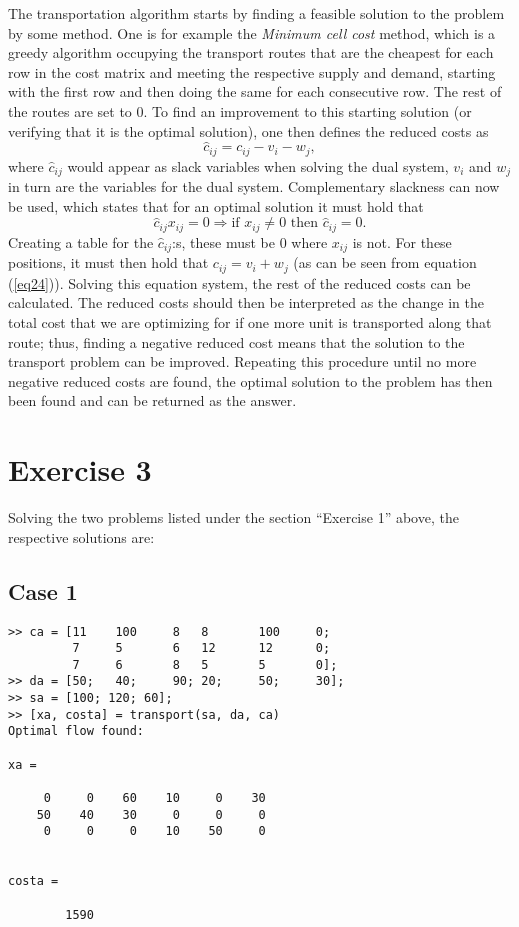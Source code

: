 \documentclass{article}
\begin{document}
  \noindent
  The transportation algorithm starts by finding a feasible solution to the
  problem by some method. One is for example the \textit{Minimum cell cost}
  method, which is a greedy algorithm occupying the transport routes that are
  the cheapest for each row in the cost matrix and meeting the respective
  supply and demand, starting with the first row and then doing the same for
  each consecutive row. The rest of the routes are set to 0.
  To find an improvement to this starting solution (or verifying that it is the
  optimal solution), one then defines the reduced costs as
  \begin{equation}
    \hat{c}_{ij} = c_{ij} - v_i - w_j,
    \label{eq24}
  \end{equation}
  where $\hat{c}_{ij}$ would appear as slack variables when solving the dual
  system, $v_i$ and $w_j$ in turn are the variables for the dual system.
  Complementary slackness can now be used, which states that for an optimal
  solution it must hold that
  \begin{equation}
    \hat{c}_{ij}x_{ij} = 0 \Rightarrow \text{if } x_{ij} \neq 0 \text{ then } \hat{c}_{ij} = 0.
  \end{equation}
  Creating a table for the $\hat{c}_{ij}$:s, these must be 0 where $x_{ij}$ is
  not. For these positions, it must then hold that $c_{ij} = v_i + w_j$ (as can
  be seen from equation (\ref{eq24})). Solving this equation system, the rest
  of the reduced costs can be calculated. The reduced costs should then be
  interpreted as the change in the total cost that we are optimizing for if one
  more unit is transported along that route; thus, finding a negative reduced
  cost means that the solution to the transport problem can be improved.
  Repeating this procedure until no more negative reduced costs are found, the
  optimal solution to the problem has then been found and can be returned as
  the answer.

  \section*{Exercise 3}
  Solving the two problems listed under the section ``Exercise 1'' above, the
  respective solutions are:

  \subsection*{Case 1}
  \begin{lstlisting}
>> ca = [11    100     8   8       100     0;
         7     5       6   12      12      0;
         7     6       8   5       5       0];
>> da = [50;   40;     90; 20;     50;     30];
>> sa = [100; 120; 60];
>> [xa, costa] = transport(sa, da, ca)
Optimal flow found:

xa =

     0     0    60    10     0    30
    50    40    30     0     0     0
     0     0     0    10    50     0


costa =

        1590
  \end{lstlisting}
\end{document}

